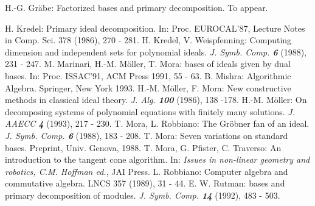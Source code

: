 \begin{thebibliography}{xxx}
 H.-G. Gr\"abe: Factorized \gr bases and primary
decomposition. To appear. 

 H. Kredel: Primary ideal decomposition. In: Proc.
EUROCAL'87, Lecture Notes in Comp. Sci. 378 (1986), 270 - 281.
 H. Kredel, V. Weispfenning: Computing dimension and
independent sets for polynomial ideals. {\it J. Symb. Comp. \bf 6} 
(1988), 231 - 247.
 M. Marinari, H.-M. M\"oller, T. Mora: \gr bases of
ideals given by dual bases. In: Proc. ISSAC'91, ACM Press 1991, 55 -
63.
 B. Mishra: Algorithmic Algebra. Springer, New York
1993.
 H.-M. M\"oller, F. Mora: New constructive methods in
classical ideal theory. {\it J. Alg. \bf 100} (1986), 138 -178.
 H.-M. M\"oller: On decomposing systems of polynomial
equations with finitely many solutions. {\em J. AAECC \bf 4} (1993),
217 - 230.  
 T. Mora, L. Robbiano: The Gr\"obner fan of an ideal.
{\it J. Symb. Comp. \bf 6} (1988), 183 - 208.
 T. Mora: Seven variations on standard bases. 
Preprint, Univ. Genova, 1988.
 T. Mora, G. Pfister, C. Traverso: An introduction to
the tangent cone algorithm. In: {\em Issues in non-linear geometry and 
robotics, C.M. Hoffman ed.}, JAI Press.
 L. Robbiano: Computer algebra and commutative algebra.
LNCS 357 (1989), 31 - 44.
 E. W. Rutman: \gr bases and primary decomposition of
modules. {\it J. Symb. Comp. \bf 14} (1992), 483 - 503.

\end{thebibliography}



